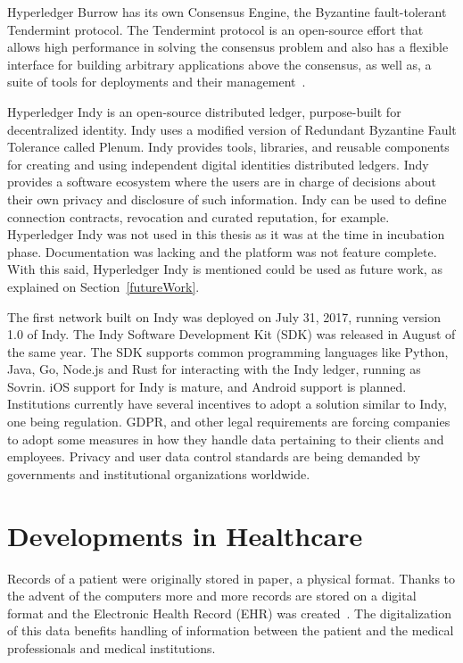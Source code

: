 Hyperledger Burrow has its own Consensus Engine, the Byzantine fault-tolerant
Tendermint protocol.  The Tendermint protocol is an open-source effort that
allows high performance in solving the consensus problem and also has a
flexible interface for building arbitrary applications above the consensus, as
well as, a suite of tools for deployments and their
management~\cite{Buchman2016}.

Hyperledger Indy is an open-source distributed ledger, purpose-built for
decentralized identity. Indy uses a modified version of Redundant Byzantine
Fault Tolerance called Plenum. Indy provides tools, libraries, and reusable
components for creating and using independent digital identities distributed
ledgers. Indy provides a software ecosystem where the users are in charge of
decisions about their own privacy and disclosure of such information.  Indy can
be used to define connection contracts, revocation and curated reputation, for
example. Hyperledger Indy was not used in this thesis as it was at the time in
incubation phase. Documentation was lacking and the platform was not feature
complete. With this said, Hyperledger Indy is mentioned could be used as future
work, as explained on Section~\ref{futureWork}.

The first network built on Indy was deployed on July 31, 2017, running version
1.0 of Indy. The Indy Software Development Kit (SDK) was released in August of
the same year. The SDK supports common programming languages like Python, Java,
Go, Node.js and Rust for interacting with the Indy ledger, running as Sovrin.
iOS support for Indy is mature, and Android support is planned. Institutions
currently have several incentives to adopt a solution similar to Indy, one
being regulation. GDPR, and other legal requirements are forcing companies to
adopt some measures in how they handle data pertaining to their clients and
employees. Privacy and user data control standards are being demanded by
governments and institutional organizations worldwide.

\section{Developments in Healthcare} \label{blockchainHealthcare}

Records of a patient were originally stored in paper, a physical format.
Thanks to the advent of the computers more and more records are stored on a
digital format and the Electronic Health Record (EHR) was
created~\cite{Marquez2017}. The digitalization of this data benefits handling
of information between the patient and the medical professionals and medical
institutions\cite{ONCoordinator2017}.

